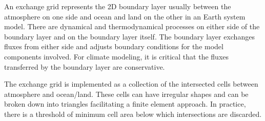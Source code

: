 
An exchange grid represents the 2D boundary layer usually between the
atmosphere on one side and ocean and land on the other in an Earth
system model. There are dynamical and thermodynamical processes on
either side of the boundary layer and on the boundary layer itself.
The boundary layer exchanges fluxes from either side and adjusts
boundary conditions for the model components involved. For climate modeling,
it is critical that the fluxes transferred by the boundary layer are
conservative.

The exchange grid is implemented as a collection of the intersected cells
between atmosphere and ocean/land\cite{BalajiXGrid}. These cells can have irregular shapes
and can be broken down into triangles facilitating a finite element
approach. In practice, there is a threshold of minimum cell area below
which intersections are discarded.
